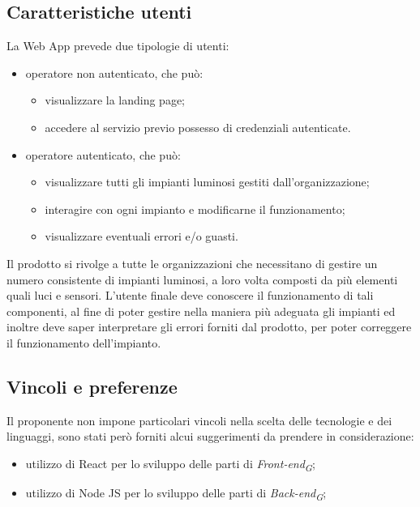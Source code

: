 \documentclass[a4paper, 12pt]{article}
\begin{document}
\subsection{Caratteristiche utenti}
La Web App prevede due tipologie di utenti:
\begin{itemize}
    \item operatore non autenticato, che può: \begin{itemize}
        \item visualizzare la landing page;
        \item accedere al servizio previo possesso di credenziali autenticate.
    \end{itemize}
    \item operatore autenticato, che può: \begin{itemize}
        \item visualizzare tutti gli impianti luminosi gestiti dall'organizzazione;
        \item interagire con ogni impianto e modificarne il funzionamento;
        \item visualizzare eventuali errori e/o guasti.
    \end{itemize}
\end{itemize}
Il prodotto si rivolge a tutte le organizzazioni che necessitano di gestire un
numero consistente di impianti luminosi, a loro volta composti da più elementi
quali luci e sensori. L'utente finale deve conoscere il funzionamento di tali
componenti, al fine di poter gestire nella maniera più adeguata gli impianti ed
inoltre deve saper interpretare gli errori forniti dal prodotto, per poter
correggere il funzionamento dell'impianto.

\subsection{Vincoli e preferenze}
Il proponente non impone particolari vincoli nella scelta delle tecnologie e dei linguaggi, sono stati però forniti alcui suggerimenti da prendere in considerazione:
\begin{itemize}
    \item utilizzo di React per lo sviluppo delle parti di \textit{Front-end\textsubscript{G}};
    \item utilizzo di Node JS per lo sviluppo delle parti di \textit{Back-end\textsubscript{G}};
\end{itemize}
\end{document}

